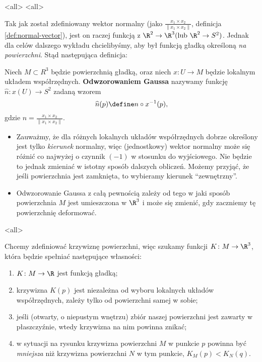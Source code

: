 \mode*
\mode<all>{}
\mode<all>{}

\begin{frame}[<+->]
Tak jak został zdefiniowany wektor normalny (jako $\frac{x_1\times x_2}{\|x_1\times x_2\|}$, definicja \ref{def:normal-vector}), jest on raczej funkcją z $\R^2\to \R^3 (\text{lub }\R^2\to S^2)$. \pause Jednak dla celów dalszego wykładu chcielibyśmy, aby był funkcją gładką określoną \textit{na powierzchni}. Stąd następująca definicja:
\pause \begin{definicja}
Niech $M\subset R^3$ będzie powierzchnią gładką, oraz niech $x\colon U\to M$ będzie lokalnym układem współrzędnych. \textbf{Odwzorowaniem Gaussa} nazywamy funkcję $\widehat{n}\colon x(U)\to S^2$ zadaną wzorem \[\widehat{n}(p)\define n\circ x^{-1}(p),\] gdzie $n=\frac{x_1\times x_2}{\|x_1\times x_2\|}$.
\end{definicja}

\end{frame}
\begin{frame}[<+->]
\begin{uwaga}
\begin{itemize}
\item Zauważmy, że dla różnych lokalnych układów współrzędnych dobrze określony jest tylko \textit{kierunek} normalny, więc (jednostkowy) wektor normalny może się różnić co najwyżej o czynnik $(-1)$ w stosunku do wyjściowego. Nie będzie to jednak zmieniać w istotny sposób dalszych obliczeń. Możemy przyjąć, że jeśli powierzchnia jest zamknięta, to wybieramy kierunek ``zewnętrzny''.
\item Odwzorowanie Gaussa z całą pewnością zależy od tego w jaki sposób powierzchnia $M$ jest umieszczona w $\R^3$ i może się zmienić, gdy zaczniemy tę powierzchnię deformować. 
\end{itemize}
\end{uwaga}

\end{frame}
\mode<all>{}
\begin{frame}[<+->]


Chcemy zdefiniować krzywiznę powierzchni, więc szukamy funkcji $K\colon M\to \R^3$, która będzie spełniać następujące własności:
\begin{enumerate}
\item $K\colon M\to \R$ jest funkcją gładką;
\item krzywizna $K(p)$ jest niezależna od wyboru lokalnych układów współrzędnych, zależy tylko od powierzchni samej w sobie;
\item jeśli (otwarty, o niepustym wnętrzu) zbiór naszej powierzchni jest zawarty w płaszczyźnie, wtedy krzywizna na nim powinna znikać;
\item w sytuacji na rysunku krzywizna powierzchni $M$ w punkcie $p$ powinna być \textit{mniejsza} niż krzywizna powierzchni $N$ w tym punkcie, $K_{M}(p)<K_{N}(q)$.
\end{enumerate}

\end{frame}
